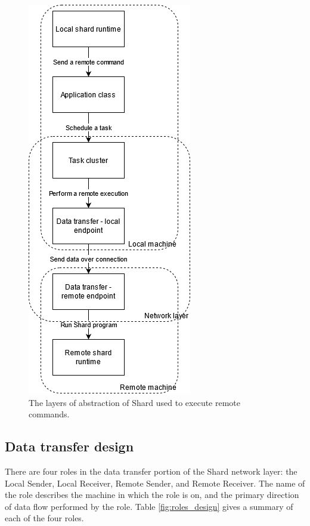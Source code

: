 \documentclass[oneside]{report}
\begin{document}
\begin{figure}[h]
  \begin{center}
    \includegraphics[scale=0.5]{img/shard_network_design.png}
    \caption{The layers of abstraction of Shard used to execute remote commands.}
    \label{fig:network_layer_design}
  \end{center}
\end{figure}

\subsection{Data transfer design}
There are four roles in the data transfer portion of the Shard network layer: the Local Sender, Local Receiver, Remote Sender, and Remote Receiver.
The name of the role describes the machine in which the role is on, and the primary direction of data flow performed by the role.
Table \ref{fig:roles_design} gives a summary of each of the four roles.
\end{document}
